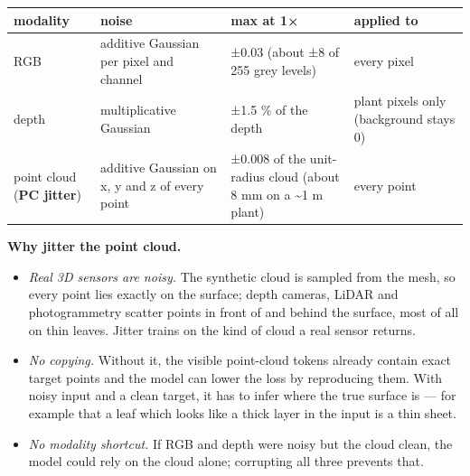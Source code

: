 \documentclass[
  10pt,
]{article}
\newcounter{none} %
\providecommand{\tightlist}{%
  \setlength{\itemsep}{0pt}\setlength{\parskip}{0pt}}
\begin{document}
{\def\LTcaptype{none} %
\begin{longtable}[]{@{}
  >{\raggedright\arraybackslash}p{}
  >{\raggedright\arraybackslash}p{}
  >{\raggedright\arraybackslash}p{}
  >{\raggedright\arraybackslash}p{}@{}}
\toprule\noalign{}
\begin{minipage}[b]{\linewidth}\raggedright
modality
\end{minipage} & \begin{minipage}[b]{\linewidth}\raggedright
noise
\end{minipage} & \begin{minipage}[b]{\linewidth}\raggedright
max at 1×
\end{minipage} & \begin{minipage}[b]{\linewidth}\raggedright
applied to
\end{minipage} \\
\midrule\noalign{}
\endhead
\bottomrule\noalign{}
\endlastfoot
RGB & additive Gaussian per pixel and channel & ±0.03 (about ±8 of 255
grey levels) & every pixel \\
depth & multiplicative Gaussian & ±1.5 \% of the depth & plant pixels
only (background stays 0) \\
point cloud (\textbf{PC jitter}) & additive Gaussian on x, y and z of
every point & ±0.008 of the unit-radius cloud (about 8 mm on a
\textasciitilde1 m plant) & every point \\
\end{longtable}
}

\textbf{Why jitter the point cloud.}

\begin{itemize}
\tightlist
\item
  \emph{Real 3D sensors are noisy.} The synthetic cloud is sampled from
  the mesh, so every point lies exactly on the surface; depth cameras,
  LiDAR and photogrammetry scatter points in front of and behind the
  surface, most of all on thin leaves. Jitter trains on the kind of
  cloud a real sensor returns.
\item
  \emph{No copying.} Without it, the visible point-cloud tokens already
  contain exact target points and the model can lower the loss by
  reproducing them. With noisy input and a clean target, it has to infer
  where the true surface is --- for example that a leaf which looks like
  a thick layer in the input is a thin sheet.
\item
  \emph{No modality shortcut.} If RGB and depth were noisy but the cloud
  clean, the model could rely on the cloud alone; corrupting all three
  prevents that.
\end{itemize}
\end{document}
